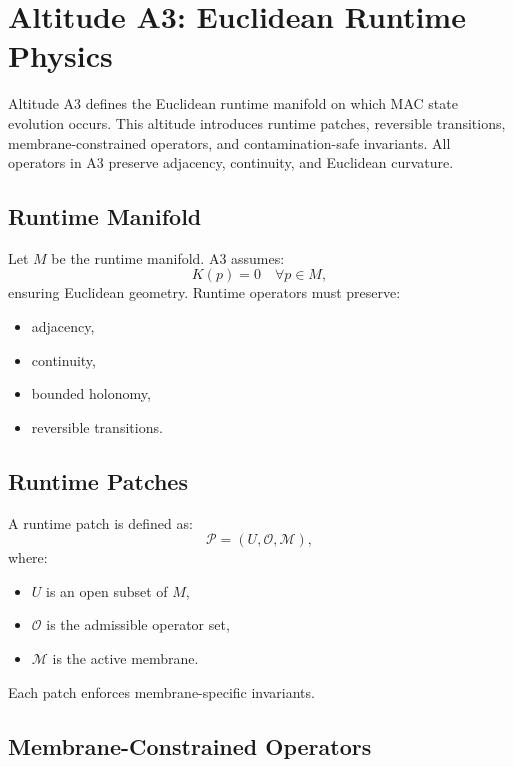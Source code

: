 
\section{Altitude A3: Euclidean Runtime Physics}

Altitude A3 defines the Euclidean runtime manifold on which MAC state evolution
occurs. This altitude introduces runtime patches, reversible transitions,
membrane-constrained operators, and contamination-safe invariants. All operators
in A3 preserve adjacency, continuity, and Euclidean curvature.

\subsection{Runtime Manifold}

Let $M$ be the runtime manifold. A3 assumes:
\[
K(p) = 0 \quad \forall p \in M,
\]
ensuring Euclidean geometry. Runtime operators must preserve:
\begin{itemize}
  \item adjacency,
  \item continuity,
  \item bounded holonomy,
  \item reversible transitions.
\end{itemize}

\subsection{Runtime Patches}

A runtime patch is defined as:
\[
\mathcal{P} = (U, \mathcal{O}, \mathcal{M}),
\]
where:
\begin{itemize}
  \item $U$ is an open subset of $M$,
  \item $\mathcal{O}$ is the admissible operator set,
  \item $\mathcal{M}$ is the active membrane.
\end{itemize}

Each patch enforces membrane-specific invariants.

\subsection{Membrane-Constrained Operators}

